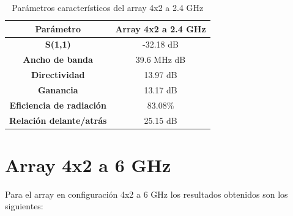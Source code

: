 \begin{table}[H]
  
   
   \small %
   \centering %
   \begin{tabular}{c c} %
   \toprule[\heavyrulewidth]\toprule[\heavyrulewidth]
   \textbf{Parámetro} & \textbf{Array 4x2 a 2.4 GHz} \\ 
   \midrule
   \textbf{S(1,1)} & -32.18 dB \\
   \textbf{Ancho de banda} & 39.6 MHz dB \\
   \textbf{Directividad} & 13.97 dB \\
   \textbf{Ganancia} & 13.17 dB \\
   \textbf{Eficiencia de radiación} & 83.08\% \\
   \textbf{Relación delante/atrás} & 25.15 dB \\

   \bottomrule[\heavyrulewidth] 
   \end{tabular}
   
   \caption{Parámetros característicos del array 4x2 a 2.4 GHz} 
   \label{tab:res4x21}
\end{table}





















\newpage
\section{Array 4x2 a 6 GHz}
\par Para el array en configuración 4x2 a 6 GHz los resultados obtenidos son los siguientes:

